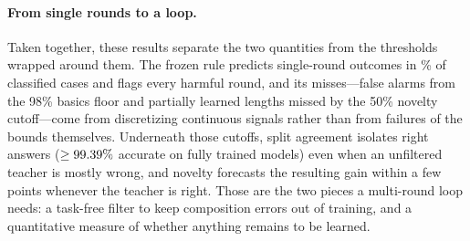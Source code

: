 \paragraph{From single rounds to a loop.}
Taken together, these results separate the two quantities from the thresholds
wrapped around them. The frozen rule predicts single-round outcomes in
\gpCorrectPct\% of classified cases and flags every harmful round, and its
misses---false alarms from the 98\% basics floor and partially learned lengths
missed by the 50\% novelty cutoff---come from discretizing continuous signals
rather than from failures of the bounds themselves. Underneath those cutoffs,
split agreement isolates right answers ($\ge99.39\%$ accurate on fully
trained models) even when an unfiltered teacher is mostly wrong, and novelty
forecasts the resulting gain within a few points whenever the teacher is right.
Those are the two pieces a multi-round loop needs: a task-free filter to keep
composition errors out of training, and a quantitative measure of whether
anything remains to be learned.
